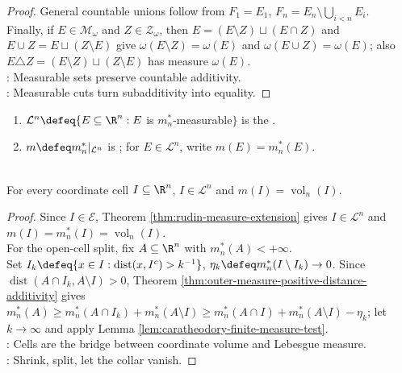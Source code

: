 \begin{theorem}
\begin{proof}
General countable unions follow from $F_1=E_1$, $F_n=E_n\setminus\bigcup_{i<n}E_i$.\\
Finally, if $E\in\mathcal{M}_\omega$ and $Z\in\mathcal{Z}_\omega$, then $E=(E\setminus Z)\sqcup(E\cap Z)$ and $E\cup Z=E\sqcup(Z\setminus E)$ give $\omega(E\setminus Z)=\omega(E)$ and $\omega(E\cup Z)=\omega(E)$; also $E\triangle Z=(E\setminus Z)\sqcup(Z\setminus E)$ has measure $\omega(E)$.\\
: Measurable sets preserve countable additivity.\\
: Measurable cuts turn subadditivity into equality.
\end{proof}
\end{theorem}

\begin{definition} \label{def:lebesgue-sigma-algebra-caratheodory} 
\begin{enumerate}[label=(\roman*)]
\setlength{\itemsep}{0pt}
\item $\mathcal{L}^n\defeq\{E\subseteq\R^n:E$ is $m_n^\ast$-measurable$\}$ is the .
\item $m\defeq m_n^\ast|_{\mathcal{L}^n}$ is ; for $E\in\mathcal{L}^n$, write $m(E)=m_n^\ast(E)$.
\end{enumerate}
\end{definition}

\begin{proposition} \label{prop:cells-lebesgue-measurable-volume} \\
For every coordinate cell $I\subseteq\R^n$, $I\in\mathcal{L}^n$ and $m(I)=\operatorname{vol}_n(I)$.
\begin{proof}
Since $I\in\mathcal{E}$, Theorem \ref{thm:rudin-measure-extension} gives $I\in\mathcal{L}^n$ and $m(I)=m_n^\ast(I)=\operatorname{vol}_n(I)$.\\
For the open-cell split, fix $A\subseteq\R^n$ with $m_n^\ast(A)<+\infty$.\\
Set $I_k\defeq\{x\in I:\operatorname{dist}(x,I^c)>k^{-1}\}$, $\eta_k\defeq m_n^\ast(I\setminus I_k)\to0$. Since $\operatorname{dist}(A\cap I_k,A\setminus I)>0$, Theorem \ref{thm:outer-measure-positive-distance-additivity} gives $m_n^\ast(A)\geq m_n^\ast(A\cap I_k)+m_n^\ast(A\setminus I)\geq m_n^\ast(A\cap I)+m_n^\ast(A\setminus I)-\eta_k$; let $k\to\infty$ and apply Lemma \ref{lem:caratheodory-finite-measure-test}.\\
: Cells are the bridge between coordinate volume and Lebesgue measure.\\
: Shrink, split, let the collar vanish.
\end{proof}
\end{proposition}
